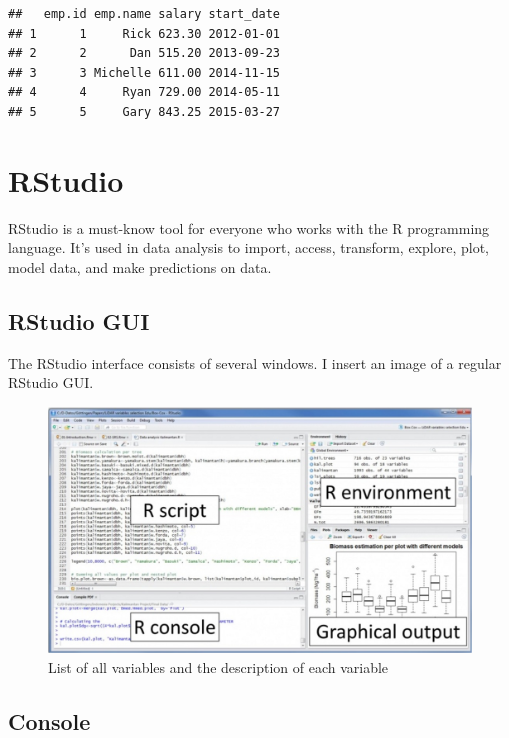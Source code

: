 \documentclass[
]{book}
\begin{document}
\begin{verbatim}
##   emp.id emp.name salary start_date
## 1      1     Rick 623.30 2012-01-01
## 2      2      Dan 515.20 2013-09-23
## 3      3 Michelle 611.00 2014-11-15
## 4      4     Ryan 729.00 2014-05-11
## 5      5     Gary 843.25 2015-03-27
\end{verbatim}

\hypertarget{rstudio}{%
\section{RStudio}\label{rstudio}}

RStudio is a must-know tool for everyone who works with the R programming language. It's used in data analysis to import, access, transform, explore, plot, model data, and make predictions on data.

\hypertarget{rstudio-gui}{%
\subsection{RStudio GUI}\label{rstudio-gui}}

The RStudio interface consists of several windows. I insert an image of a regular RStudio GUI.

\begin{figure}

{\centering \includegraphics[width=0.8\linewidth]{img01/RStudioGUI01} 

}

\caption{List of all variables and the description of each variable}\label{fig:unnamed-chunk-12}
\end{figure}

\hypertarget{console}{%
\subsection{Console}\label{console}}
\end{document}

